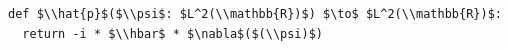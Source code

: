 \documentclass[border=10pt]{standalone}
\begin{document}
\begin{lstlisting}
def $\\hat{p}$($\\psi$: $L^2(\\mathbb{R})$) $\to$ $L^2(\\mathbb{R})$:
  return -i * $\\hbar$ * $\nabla$($(\\psi)$)
\end{lstlisting}
\end{document}
